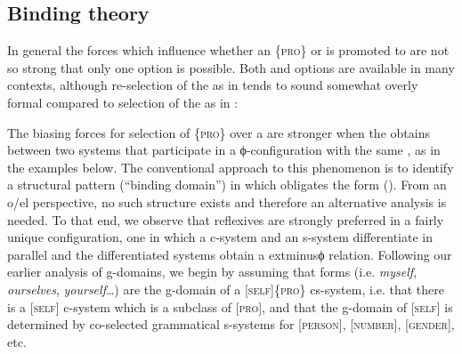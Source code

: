 \subsection{Binding theory}

In general the forces which influence whether an  \{\textsc{pro}\} or  is promoted to  are not so strong that only one option is possible. Both  and  options are available in many contexts, although re-selection of the  as in  tends to sound somewhat overly formal compared to selection of the  as in :

\ea\label{ex:7:13}
   \label{ex:7:13a}
    \label{ex:7:13b}
\z
\z

  The biasing forces for selection of \{\textsc{pro}\} over a  are stronger when the  obtains between two systems that participate in a ϕ-con\-fig\-u\-ra\-tion with the same , as in the examples below. The conventional approach to this phenomenon is to identify a structural pattern (“binding domain”) in which  obligates the  form (\citealt{Chomsky1982,Chomsky1993,Haegeman1994,Reinhart1976,Safir2004}). From an o/el perspective, no such structure exists and therefore an alternative analysis is needed. To that end, we observe that reflexives are strongly preferred in a fairly unique configuration, one in which a c-system and an s-system differentiate in parallel and the differentiated systems obtain a 	extminus{}ϕ relation. Following our earlier analysis of  g-domains, we begin by assuming that  forms (i.e. \textit{myself}, \textit{ourselves}, \textit{yourself}…) are the g-domain of a [\textsc{self}]\{\textsc{pro}\} cs-system, i.e. that there is a [\textsc{self}] c-system which is a subclass of [\textsc{pro}], and that the g-domain of [\textsc{self}] is determined by co-selected grammatical s-systems for [\textsc{person}], [\textsc{number}], [\textsc{gender}], etc. 

\ea\label{ex:7:14}
 \label{ex:7:14a}     
 \label{ex:7:14b}       
\z
\z

